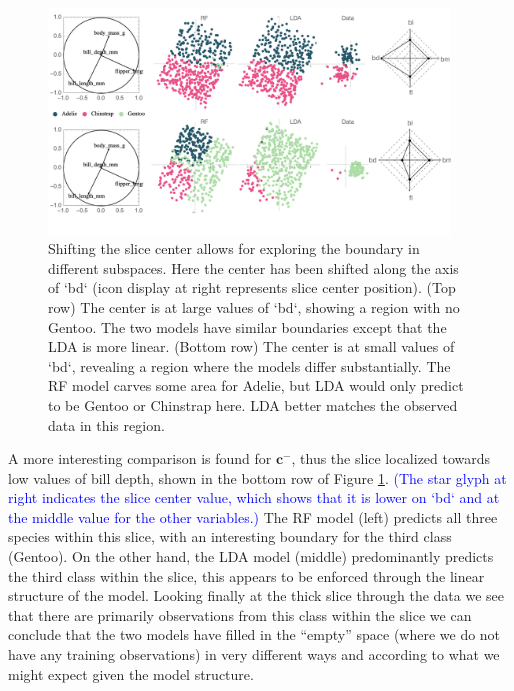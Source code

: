 \documentclass[]{interact}
\theoremstyle{plain}%
\theoremstyle{definition}
\theoremstyle{remark}
\begin{document}
\begin{figure}[ht]
\centerline{\includegraphics[width=0.95\textwidth]{figures/slice1_p.pdf}}
\caption{Shifting the slice center allows for exploring the boundary in different subspaces. Here the center has been shifted along the axis of `bd` (icon display at right represents slice center position). (Top row) The center is at large values of `bd`, showing a region with no Gentoo. The two models have similar boundaries except that the LDA is more linear. (Bottom row) The center is at small values of `bd`, revealing a region where the models differ substantially. The RF model carves some area for Adelie, but LDA would only predict to be Gentoo or Chinstrap here. LDA better matches the observed data in this region.}
\label{slice1p}
\end{figure}

A more interesting comparison is found for \(\mathbf{c}^{-}\), thus the
slice localized towards low values of bill depth, shown in the bottom
row of Figure \ref{slice1p}.
\textcolor{blue}{(The star glyph at right indicates the slice center value, which shows that it is lower on `bd` and at the middle value for the other variables.)}
The RF model (left) predicts all three species within this slice, with
an interesting boundary for the third class (Gentoo). On the other hand,
the LDA model (middle) predominantly predicts the third class within the
slice, this appears to be enforced through the linear structure of the
model. Looking finally at the thick slice through the data we see that
there are primarily observations from this class within the slice we can
conclude that the two models have filled in the ``empty'' space (where
we do not have any training observations) in very different ways and
according to what we might expect given the model structure.
\end{document}
